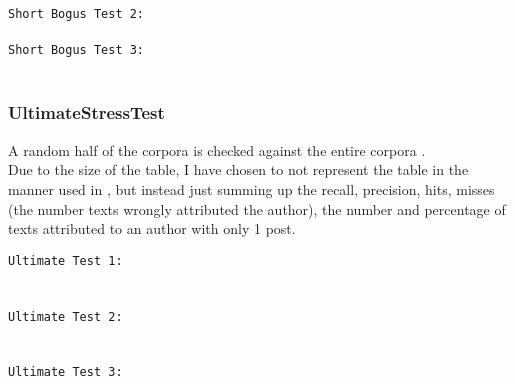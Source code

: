 \texttt{Short Bogus Test 2:}\\
\\

\texttt{Short Bogus Test 3:}\\
\\

\clearpage
\subsubsection{UltimateStressTest}
A random half of the corpora is checked against the entire corpora .\\
Due to the size of the table, I have chosen to not represent the table in the manner used in \cite{nr4}, but instead just summing up the recall, precision, hits, misses (the number texts wrongly attributed the author), the number and percentage of texts attributed to an author with only 1 post.

\texttt{Ultimate Test 1:}\\\\
\\

\clearpage
\texttt{Ultimate Test 2:}\\\\
\\

\clearpage
\texttt{Ultimate Test 3:}\\\\
\\

